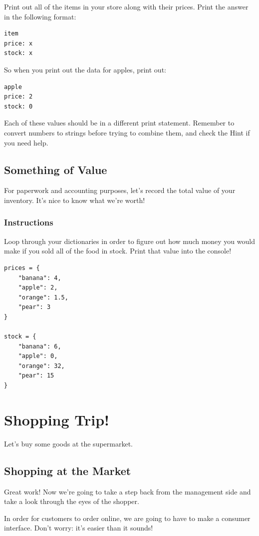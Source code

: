 \documentclass[12pt,a4paper,final,twoside,onecolumn,titlepage]{book}
\begin{document}
Print out all of the items in your store along with their prices. Print the answer in the following format:
\begin{lstlisting}
item
price: x
stock: x
\end{lstlisting}
So when you print out the data for apples, print out:
\begin{lstlisting}
apple
price: 2
stock: 0
\end{lstlisting}
Each of these values should be in a different print statement. Remember to convert numbers to strings before trying to combine them, and check the Hint if you need help.

\subsection{Something of Value}

For paperwork and accounting purposes, let's record the total value of your inventory. It's nice to know what we're worth!
\subsubsection{Instructions}

Loop through your dictionaries in order to figure out how much money you would make if you sold all of the food in stock. Print that value into the console!

\begin{lstlisting}
prices = {
    "banana": 4,
    "apple": 2,
    "orange": 1.5,
    "pear": 3
}
    
stock = {
    "banana": 6,
    "apple": 0,
    "orange": 32,
    "pear": 15
}
\end{lstlisting}

\section{Shopping Trip!}

    Let's buy some goods at the supermarket.

\subsection{Shopping at the Market}

Great work! Now we're going to take a step back from the management side and take a look through the eyes of the shopper.

In order for customers to order online, we are going to have to make a consumer interface. Don't worry: it's easier than it sounds!
\end{document}
